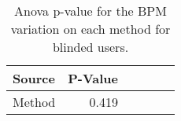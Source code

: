 
\begin{table}[!htb]
\centering
\caption{Anova p-value for the BPM variation on each method for blinded users.}
\label{tab:blocanova_bpm_var_blind}
\begin{tabular}{lrrrrr}
\toprule
Source & P-Value \\
\midrule
Method &   0.419 \\
\bottomrule
\end{tabular}
\end{table}

